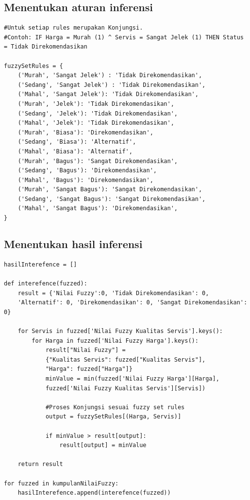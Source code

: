\documentclass[12pt,a4paper]{article}
\theoremstyle{remark}
\begin{document}
\subsection*{Menentukan aturan inferensi}
\begin{verbatim}
#Untuk setiap rules merupakan Konjungsi.
#Contoh: IF Harga = Murah (1) ^ Servis = Sangat Jelek (1) THEN Status = Tidak Direkomendasikan

fuzzySetRules = {
    ('Murah', 'Sangat Jelek') : 'Tidak Direkomendasikan',
    ('Sedang', 'Sangat Jelek') : 'Tidak Direkomendasikan',
    ('Mahal', 'Sangat Jelek'): 'Tidak Direkomendasikan',
    ('Murah', 'Jelek'): 'Tidak Direkomendasikan',
    ('Sedang', 'Jelek'): 'Tidak Direkomendasikan',
    ('Mahal', 'Jelek'): 'Tidak Direkomendasikan',
    ('Murah', 'Biasa'): 'Direkomendasikan',
    ('Sedang', 'Biasa'): 'Alternatif',
    ('Mahal', 'Biasa'): 'Alternatif',
    ('Murah', 'Bagus'): 'Sangat Direkomendasikan',
    ('Sedang', 'Bagus'): 'Direkomendasikan',
    ('Mahal', 'Bagus'): 'Direkomendasikan',
    ('Murah', 'Sangat Bagus'): 'Sangat Direkomendasikan',
    ('Sedang', 'Sangat Bagus'): 'Sangat Direkomendasikan',
    ('Mahal', 'Sangat Bagus'): 'Direkomendasikan',
}
\end{verbatim}
\subsection*{Menentukan hasil inferensi}
\begin{verbatim}
hasilInterefence = []

def interefence(fuzzed):
    result = {'Nilai Fuzzy':0, 'Tidak Direkomendasikan': 0, 
    'Alternatif': 0, 'Direkomendasikan': 0, 'Sangat Direkomendasikan': 0}

    for Servis in fuzzed['Nilai Fuzzy Kualitas Servis'].keys():
        for Harga in fuzzed['Nilai Fuzzy Harga'].keys():
            result["Nilai Fuzzy"] = 
            {"Kualitas Servis": fuzzed["Kualitas Servis"], 
            "Harga": fuzzed["Harga"]}
            minValue = min(fuzzed['Nilai Fuzzy Harga'][Harga], 
            fuzzed['Nilai Fuzzy Kualitas Servis'][Servis])

            #Proses Konjungsi sesuai fuzzy set rules
            output = fuzzySetRules[(Harga, Servis)]

            if minValue > result[output]:
                result[output] = minValue

    return result

for fuzzed in kumpulanNilaiFuzzy:
    hasilInterefence.append(interefence(fuzzed))
\end{verbatim}
\end{document}
